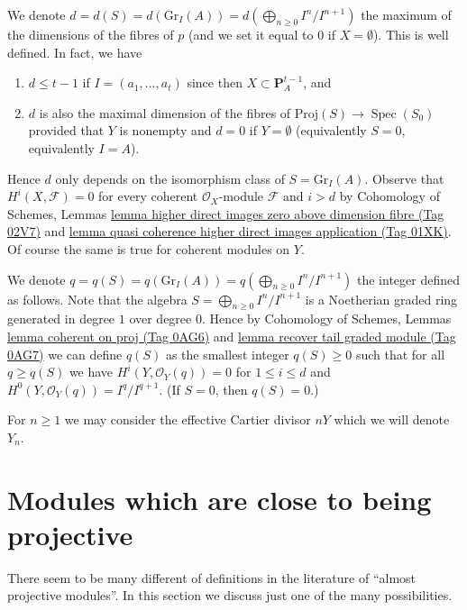 \documentclass{amsart}
\theoremstyle{plain}
\theoremstyle{definition}
\theoremstyle{remark}
\numberwithin{equation}{subsection}
\def\Spec{\mathop{\mathrm{Spec}}}
\begin{document}
\medskip\noindent
We denote
$d = d(S) = d(\text{Gr}_I(A)) = d(\bigoplus_{n \geq 0} I^n/I^{n + 1})$
the maximum of the dimensions of the fibres of $p$
(and we set it equal to $0$ if $X = \emptyset$).
This is well defined. In fact, we have
\begin{enumerate}
\item $d \leq t - 1$ if $I = (a_1, \ldots, a_t)$ since then
$X \subset \mathbf{P}^{t - 1}_A$, and
\item $d$ is also the maximal dimension of the fibres of
$\text{Proj}(S) \to \Spec(S_0)$ provided that $Y$
is nonempty and $d = 0$ if $Y = \emptyset$
(equivalently $S = 0$, equivalently $I = A$).
\end{enumerate}
Hence $d$ only depends on the isomorphism class of $S = \text{Gr}_I(A)$.
Observe that $H^i(X, \mathcal{F}) = 0$ for every coherent
$\mathcal{O}_X$-module $\mathcal{F}$ and $i > d$ by
Cohomology of Schemes, Lemmas
\href{https://stacks.math.columbia.edu/tag/02V7}{lemma higher direct images zero above dimension fibre (Tag 02V7)} and
\href{https://stacks.math.columbia.edu/tag/01XK}{lemma quasi coherence higher direct images application (Tag 01XK)}.
Of course the same is true for coherent modules on $Y$.

\medskip\noindent
We denote
$q = q(S) = q(\text{Gr}_I(A)) = q(\bigoplus_{n \geq 0} I^n/I^{n + 1})$
the integer defined as follows. Note that the algebra
$S = \bigoplus_{n \geq 0} I^n/I^{n + 1}$
is a Noetherian graded ring generated in degree $1$ over degree $0$.
Hence by
Cohomology of Schemes, Lemmas \href{https://stacks.math.columbia.edu/tag/0AG6}{lemma coherent on proj (Tag 0AG6)} and
\href{https://stacks.math.columbia.edu/tag/0AG7}{lemma recover tail graded module (Tag 0AG7)} we can define $q(S)$
as the smallest integer $q(S) \geq 0$ such that for all $q \geq q(S)$ we have
$H^i(Y, \mathcal{O}_Y(q)) = 0$ for $1 \leq i \leq d$ and
$H^0(Y, \mathcal{O}_Y(q)) = I^q/I^{q + 1}$.
(If $S = 0$, then $q(S) = 0$.)

\medskip\noindent
For $n \geq 1$ we may consider the effective Cartier divisor $nY$
which we will denote $Y_n$.



\section{Modules which are close to being projective}
\label{more-algebra-section-near-projective}

\noindent
There seem to be many different of definitions in the literature of
``almost projective modules''. In this section we discuss just one
of the many possibilities.
\end{document}

